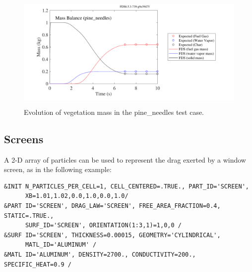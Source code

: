 \documentclass[11pt]{book}
\begin{document}
\begin{figure}[ht]
\begin{center}
\includegraphics[height=2.2in]{SCRIPT_FIGURES/pine_needles}
\end{center}
\caption[Example of burning vegetation]{Evolution of vegetation mass in the {\ct pine\_needles} test case.}
\label{pine_needles}
\end{figure}



\subsection{Screens}
\label{info:particle_screen}

A 2-D array of particles can be used to represent the drag exerted by a window screen, as in the following example:

\begin{lstlisting}
&INIT N_PARTICLES_PER_CELL=1, CELL_CENTERED=.TRUE., PART_ID='SCREEN',
      XB=1.01,1.02,0.0,1.0,0.0,1.0/
&PART ID='SCREEN', DRAG_LAW='SCREEN', FREE_AREA_FRACTION=0.4, STATIC=.TRUE.,
      SURF_ID='SCREEN', ORIENTATION(1:3,1)=1,0,0 /
&SURF ID='SCREEN', THICKNESS=0.00015, GEOMETRY='CYLINDRICAL',
      MATL_ID='ALUMINUM' /
&MATL ID='ALUMINUM', DENSITY=2700., CONDUCTIVITY=200., SPECIFIC_HEAT=0.9 /
\end{lstlisting}
\end{document}
